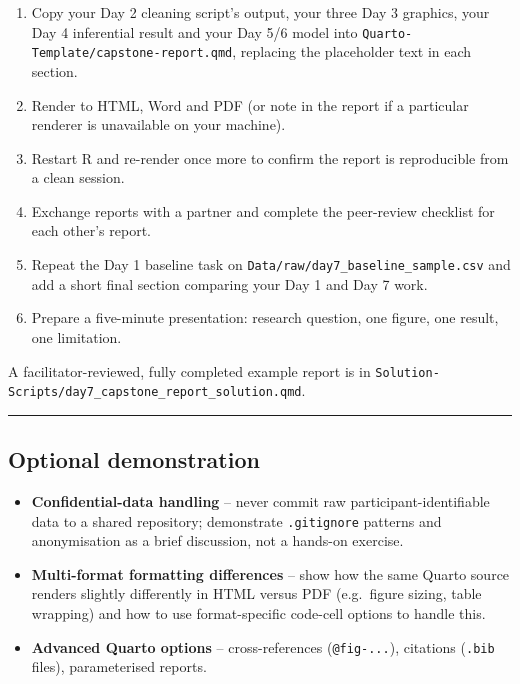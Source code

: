 \documentclass[11pt]{article}
\providecommand{\tightlist}{%
  \setlength{\itemsep}{0pt}\setlength{\parskip}{0pt}}
\begin{document}
\begin{enumerate}
\def\labelenumi{\arabic{enumi}.}
\tightlist
\item
  Copy your Day 2 cleaning script's output, your three Day 3 graphics,
  your Day 4 inferential result and your Day 5/6 model into
  \texttt{Quarto-Template/capstone-report.qmd}, replacing the
  placeholder text in each section.
\item
  Render to HTML, Word and PDF (or note in the report if a particular
  renderer is unavailable on your machine).
\item
  Restart R and re-render once more to confirm the report is
  reproducible from a clean session.
\item
  Exchange reports with a partner and complete the peer-review checklist
  for each other's report.
\item
  Repeat the Day 1 baseline task on
  \texttt{Data/raw/day7\_baseline\_sample.csv} and add a short final
  section comparing your Day 1 and Day 7 work.
\item
  Prepare a five-minute presentation: research question, one figure, one
  result, one limitation.
\end{enumerate}

A facilitator-reviewed, fully completed example report is in
\texttt{Solution-Scripts/day7\_capstone\_report\_solution.qmd}.

\begin{center}\rule{0.5\linewidth}{0.5pt}\end{center}

\hypertarget{optional-demonstration}{%
\subsection{Optional demonstration}\label{optional-demonstration}}

\begin{itemize}
\tightlist
\item
  \textbf{Confidential-data handling} -- never commit raw
  participant-identifiable data to a shared repository; demonstrate
  \texttt{.gitignore} patterns and anonymisation as a brief discussion,
  not a hands-on exercise.
\item
  \textbf{Multi-format formatting differences} -- show how the same
  Quarto source renders slightly differently in HTML versus PDF
  (e.g.~figure sizing, table wrapping) and how to use format-specific
  code-cell options to handle this.
\item
  \textbf{Advanced Quarto options} -- cross-references
  (\texttt{@fig-...}), citations (\texttt{.bib} files), parameterised
  reports.
\end{itemize}
\end{document}
